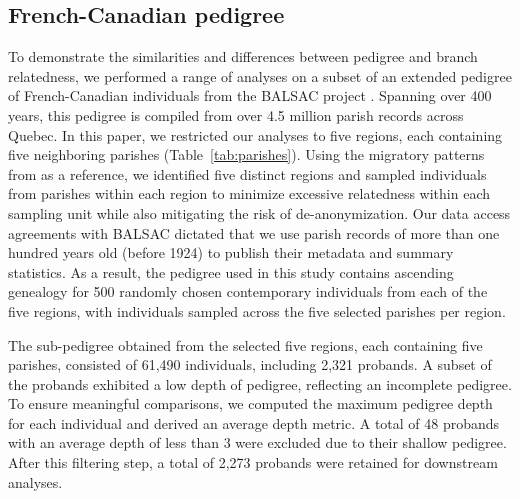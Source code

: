 

\subsection{French-Canadian pedigree}

To demonstrate the similarities and differences between pedigree and branch relatedness, we performed a range of analyses on a subset of an extended pedigree of French-Canadian individuals from the BALSAC project \citep{vezina2020overview}.
%
Spanning over 400 years, this pedigree is compiled from over 4.5 million parish records across Quebec.
%
In this paper, we restricted our analyses to five regions,
each containing five neighboring parishes (Table~\ref{tab:parishes}).
%
Using the migratory patterns from \citet{andersontrocme2023genes} as a reference,
we identified five distinct regions and sampled individuals from parishes within each region 
to minimize excessive relatedness within each sampling unit 
while also mitigating the risk of de-anonymization.
%
Our data access agreements with BALSAC dictated that we use parish records of more than one hundred years old
(before 1924) to publish their metadata and summary statistics.
%
As a result, the pedigree used in this study contains ascending genealogy for
500 randomly chosen contemporary individuals from each of the five regions,
with individuals sampled across the five selected parishes per region.

The sub-pedigree obtained from the selected five regions, each containing five parishes,
consisted of 61,490 individuals, including 2,321 probands.
%
A subset of the probands exhibited a low depth of pedigree,
reflecting an incomplete pedigree.
%
To ensure meaningful comparisons, we computed the maximum pedigree depth
for each individual and derived an average depth metric.
%
A total of 48 probands with an average depth of less than 3 were excluded
due to their shallow pedigree.
%
After this filtering step, a total of 2,273 probands were retained for downstream analyses.

